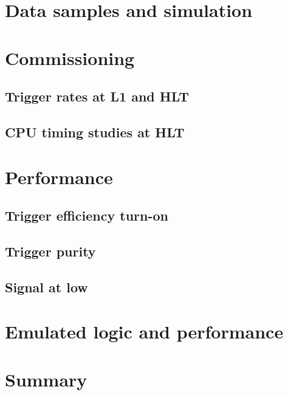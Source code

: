 


\clearpage
\section{Data samples and simulation}
\clearpage
\section{Commissioning}
\subsection{Trigger rates at L1 and HLT}
\subsection{CPU timing studies at HLT}
\clearpage
\section{Performance}
\subsection{Trigger efficiency turn-on}
\subsection{Trigger purity}
\subsection{Signal \texorpdfstring{\axe}{AxE} at low \texorpdfstring{\qsq}{q2}}
\clearpage
\section{Emulated logic and performance}
\clearpage
\section{Summary}

\newpage
\begin{acknowledgments}
\end{acknowledgments}

\newpage


%
